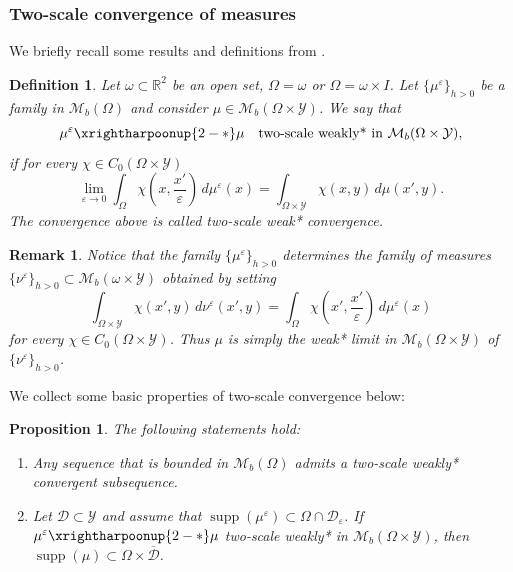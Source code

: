 \documentclass[reqno,10pt]{amsart}
\numberwithin{equation}{section}
\newtheorem{proposition}[theorem]{Proposition}
\newtheorem{definition}[theorem]{Definition}
\newtheorem{remark}[theorem]{Remark}
\theoremstyle{remark}
\newcommand{\calD}{\mathcal{D}}
\newcommand{\R}{\mathbb{R}}
\newcommand{\calY}{\mathcal{Y}}
\DeclareMathOperator{\supp}{supp}
\newcommand{\closure}[1]{\overline{#1}}
\newcommand{\weakstartwoscale}{\xrightharpoonup{2-*}}
\newcommand{\eps}{\varepsilon}
\newcommand{\Mb}{\mathcal{M}_b}
\begin{document}
\subsubsection{Two-scale convergence of measures} \label{section two-scale convergence of measures}
We briefly recall some results and definitions from \cite[Section 4.1]{Francfort.Giacomini.2014}. 

\begin{definition}
\label{def:2-scale-meas}
Let $\omega \subset \R^2$ be an open set, $\Omega=\omega$ or $\Omega=\omega \times I$.
Let $\{\mu^\eps\}_{h>0}$ be a family in $\Mb(\Omega)$ and consider $\mu \in \Mb(\Omega \times \calY)$. 
We say that
\begin{equation*}
	\mu^\eps \weakstartwoscale \mu \quad \text{two-scale weakly* in }\Mb(\Omega \times \calY),
\end{equation*}
if for every $\chi \in C_0(\Omega \times \calY)$
\begin{equation*}
	\lim_{\eps \to 0} \int_{\Omega} \chi\left(x,\frac{x'}{\eps}\right) \,d\mu^\eps(x) = \int_{\Omega \times \calY} \chi(x,y) \,d\mu(x',y).
\end{equation*}
The convergence above is called \emph{two-scale weak* convergence}.
\end{definition}

\begin{remark} \label{transfertwoscale}
Notice that the family $\{\mu^\eps\}_{h>0}$ determines the family of measures $\{\nu^\eps\}_{h>0} \subset \Mb(\omega \times \calY)$ obtained by setting
\[
	\int_{\Omega \times \calY} \chi(x',y)\,d\nu^\eps(x',y) =\int_{\Omega} \chi \left(x',\frac{x'}{\eps}\right) \,d\mu^\eps (x)
\]
for every $\chi \in C_0(\Omega \times \calY)$. Thus $\mu$ is simply the weak* limit in $\Mb(\Omega \times \calY)$ of $\{\nu^\eps\}_{h>0}$. 
\end{remark} 

We collect some basic properties of two-scale convergence below:

\begin{proposition} \label{proposition properties two-scale convergence} 
The following statements hold:
\begin{enumerate}[label=(\roman*)]
	\item
	Any sequence that is bounded in $\Mb(\Omega)$ admits a two-scale weakly* convergent subsequence.
	\item 
	Let $\calD \subset \calY$ and assume that 
	$\supp(\mu^\eps) \subset \Omega \cap \calD_\eps$.
	If $\mu^\eps \weakstartwoscale \mu$ two-scale weakly* in $\Mb(\Omega \times \calY)$, then $\supp(\mu) \subset \Omega \times \closure{\calD}$.
\end{enumerate}
\end{proposition}
\end{document}
